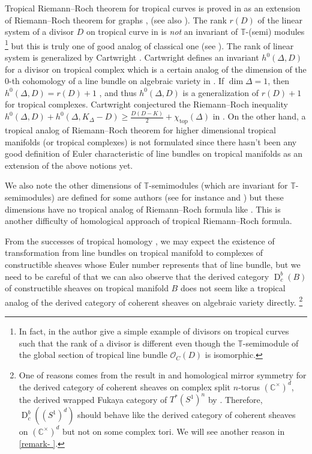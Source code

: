 \documentclass[a4paper,dvipdfmx,reqno,12pt]{amsart}
\theoremstyle{definition}
\newcommand{\C}{\mathbb{C}}%
\newcommand{\mb}[1]{\mathbb{#1}}%
\newcommand{\mcal}[1]{\mathcal{#1}}%
\newcommand{\opn}[1]{\operatorname{#1}}
\newcommand{\myfootnote}[1]{\hspace{-5pt}\footnote{#1}}
\numberwithin{equation}{section}
\begin{document}
Tropical Riemann--Roch theorem for tropical curves 
is proved in \cite{gathmannRiemannRochTheoremTropical2008a}
as an extension of Riemann--Roch theorem for graphs
\cite{MR2355607}, (see also 
\cite{mikhalkinTropicalCurvesTheir2008a}). The rank $r(D)$ of the linear system of a divisor $D$ 
on tropical curve in 
\cite{gathmannRiemannRochTheoremTropical2008a}
is \emph{not} an invariant of $\mb{T}$-(semi)
modules
\myfootnote{In fact, 
in \cite[Example 6.5]{yoshitomi2011generators} 
the author give a simple example of divisors on 
tropical curves such that 
the rank of a divisor is different even though 
the $\mathbb{T}$-semimodule of the global section of 
tropical line bundle $\mcal{O}_C(D)$ is isomorphic.}
but this is truly one of good analog of classical one 
(see \cite[Lemma 2.4]{MR2448666}).
The rank of linear system is generalized by Cartwright
\cite{MR4131998,MR4251610}.
Cartwright defines an invariant 
$h^{0}(\Delta,D)$ for a divisor on tropical complex
which is a certain analog of the dimension of
the $0$-th cohomology of a line bundle on algebraic 
variety in \cite[Definition 3.1]{MR4251610}.
If $\dim \Delta=1$, then $h^{0}(\Delta,D)=r(D)+1$
\cite[Proposition 3.3]{MR4251610}, and thus $h^{0}(\Delta,D)$
is a generalization of $r(D)+1$ for tropical complexes. 
Cartwright conjectured the Riemann--Roch inequality
$h^{0}(\Delta,D)+h^{0}(\Delta,K_{\Delta}-D)\geq 
\frac{D(D-K)}{2}+\chi_{\opn{top}}(\Delta)$
in \cite[Conjecture 3.6]{MR4251610}.
On the other hand, a tropical analog of Riemann--Roch theorem
for higher dimensional tropical manifolds 
(or tropical complexes) is not formulated
since there hasn't been any good definition of 
Euler characteristic of line bundles on tropical 
manifolds as an extension of the above notions yet.

We also note the other dimensions of $\mb{T}$-semimodules 
(which are invariant for $\mb{T}$-semimodules) are defined for 
some authors 
(see for instance 
\cite[Definition 2.3]{mikhalkinTropicalCurvesTheir2008a}
and \cite[p.8]{yoshitomi2011generators}) but 
these dimensions have no tropical analog of 
Riemann--Roch formula like 
\cite{MR2355607,gathmannRiemannRochTheoremTropical2008a}.
This is another difficulty of homological approach of 
tropical Riemann--Roch formula. 

From the successes of tropical homology 
\cite{itenbergTropicalHomology2019b}, we 
may expect the existence of transformation from 
line bundles on tropical manifold to complexes of
constructible sheaves whose Euler number 
represents that of line bundle, but we need to 
be careful of that we can also observe that
the derived category $\opn{D}_{c}^{b}(B)$
of constructible sheaves on 
tropical manifold $B$ does not seem like a tropical 
analog of the derived category of coherent 
sheaves on algebraic variety directly.
\myfootnote{One of reasons
comes from the result in \cite{MR2449059,MR2565051}
and homological mirror symmetry for 
the derived category of coherent sheaves on complex split $n$-torus 
$(\C^{\times})^{d}$, the derived wrapped Fukaya category of $T^{*}(S^{1})^{n}$
by \cite{MR2822213}.
Therefore, $\opn{D}_c^{b}((S^{1})^{d})$ should behave like 
the derived category of coherent sheaves on 
$(\C^{\times})^{d}$
but not on some complex tori.
We will see another reason in \cref{remark- }.
}
\end{document}
